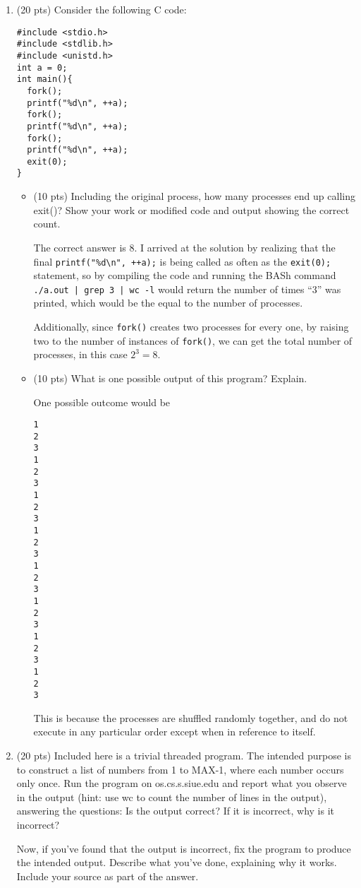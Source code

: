 \documentclass[12pt]{article}
\begin{document}
\begin{enumerate}
\item (20 pts) Consider the following C code:
\begin{verbatim}
#include <stdio.h>
#include <stdlib.h>
#include <unistd.h>
int a = 0;
int main(){
  fork();
  printf("%d\n", ++a);
  fork();
  printf("%d\n", ++a);
  fork();
  printf("%d\n", ++a);
  exit(0);
}
\end{verbatim}
\begin{itemize}
\item (10 pts) Including the original process, how many processes end up calling
  exit()? Show your work or modified code and output showing the correct
  count.
  
  The correct answer is 8. I arrived at the solution by realizing that the final \verb#printf("%d\n", ++a);# is being
  called as often as the \verb#exit(0);# statement, so by compiling the code and running the BASh command
  \verb#./a.out | grep 3 | wc -l# would return the number of times ``3'' was printed, which would be the equal to
  the number of processes.

  Additionally, since \verb#fork()# creates two processes for every one, by raising two to the number of instances of \verb#fork()#, we can get the total number of processes, in this case $2^3 = 8$.
\item (10 pts) What is one possible output of this program? Explain.

  One possible outcome would be
\begin{verbatim}
1
2
3
1
2
3
1
2
3
1
2
3
1
2
3
1
2
3
1
2
3
1
2
3
\end{verbatim}
This is because the processes are shuffled randomly together, and do not execute in any particular order except when in reference to itself.
\end{itemize}

\item (20 pts) Included here is a trivial threaded program. The intended
  purpose is to construct a list of numbers from 1 to MAX-1, where each
  number occurs only once. Run the
  program on os.cs.s.siue.edu and report what you observe in the
  output (hint: use wc to count the number of lines in the output),
  answering the questions: Is the output correct? If it is incorrect,
  why is it incorrect? 

  Now, if you've found that the output is incorrect, fix the program
  to produce the intended output. Describe what you've done,
  explaining why it works. Include your source as part of the answer. 


\end{enumerate}
\end{document}
